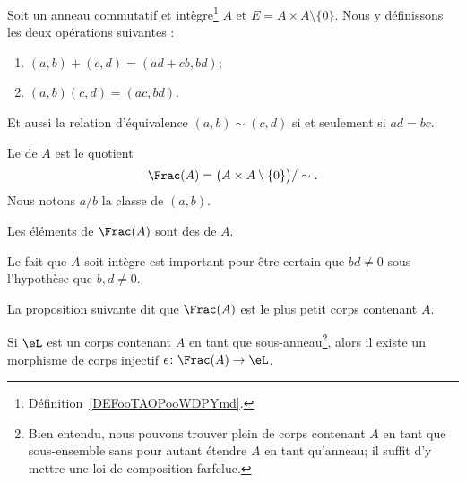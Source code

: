 \begin{definition}       \label{DEFooGJYXooOiJQvP}
    Soit un anneau commutatif et intègre\footnote{Définition~\ref{DEFooTAOPooWDPYmd}.} \( A\) et \( E=A\times A\setminus\{ 0 \}\). Nous y définissons les deux opérations suivantes :
    \begin{enumerate}
        \item
            \( (a,b)+(c,d)=(ad+cb,bd)\);
        \item
            \( (a,b)(c,d)=(ac,bd)\).
    \end{enumerate}
    Et aussi la relation d'équivalence \( (a,b)\sim(c,d)\) si et seulement si \( ad=bc\).

    Le  de \( A\) est le quotient
    \begin{equation}
        \Frac(A)=\big( A\times A\setminus\{ 0 \} \big)/\sim.
    \end{equation}
    Nous notons \( a/b\) la classe de \( (a,b)\).

    Les éléments de \( \Frac(A)\) sont des  de \( A\).
\end{definition}
Le fait que \( A\) soit intègre est important pour être certain que \( bd\neq 0\) sous l'hypothèse que \( b,d\neq 0\).

La proposition suivante dit que \( \Frac(A)\) est le plus petit corps contenant \( A\).

\begin{proposition}      \label{PROPooGSHDooJOnDsp}
    Si \( \eL\) est un corps contenant \( A\) en tant que sous-anneau\footnote{Bien entendu, nous pouvons trouver plein de corps contenant \( A\) en tant que sous-ensemble sans pour autant étendre \( A\) en tant qu'anneau; il suffit d'y mettre une loi de composition farfelue.}, alors il existe un morphisme de corps injectif \( \epsilon\colon \Frac(A)\to \eL\).
\end{proposition}

